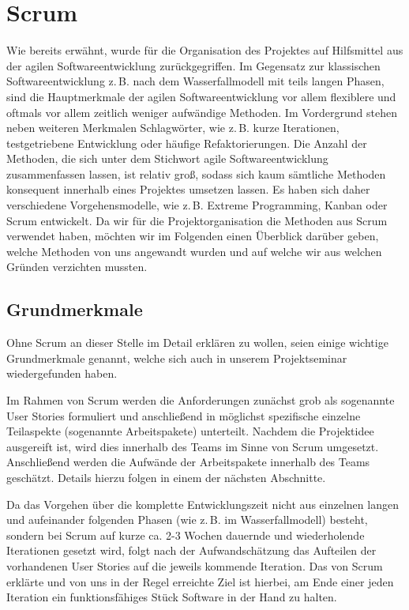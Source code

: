 \section{Scrum}
Wie bereits erwähnt, wurde für die Organisation des Projektes auf Hilfsmittel aus der agilen Softwareentwicklung zurückgegriffen. Im Gegensatz zur klassischen Softwareentwicklung z.\,B. nach dem Wasserfallmodell mit teils langen Phasen, sind die Hauptmerkmale der agilen Softwareentwicklung vor allem flexiblere und oftmals vor allem zeitlich weniger aufwändige Methoden. Im Vordergrund stehen neben weiteren Merkmalen Schlagwörter, wie z.\,B. kurze Iterationen, testgetriebene Entwicklung oder häufige Refaktorierungen. %
Die Anzahl der Methoden, die sich unter dem Stichwort agile Softwareentwicklung zusammenfassen lassen, ist relativ groß, sodass sich kaum sämtliche Methoden konsequent innerhalb eines Projektes umsetzen lassen. Es haben sich daher verschiedene Vorgehensmodelle, wie z.\,B. Extreme Programming, Kanban oder Scrum entwickelt. Da wir für die Projektorganisation die Methoden aus Scrum verwendet haben, möchten wir im Folgenden einen Überblick darüber geben, welche Methoden von uns angewandt wurden und auf welche wir aus welchen Gründen verzichten mussten.

\subsection{Grundmerkmale}
Ohne Scrum an dieser Stelle im Detail erklären zu wollen, seien einige wichtige Grundmerkmale genannt, welche sich auch in unserem Projektseminar wiedergefunden haben.

Im Rahmen von Scrum werden die Anforderungen zunächst grob als sogenannte User Stories formuliert und anschließend in möglichst spezifische einzelne Teilaspekte (sogenannte Arbeitspakete) unterteilt. Nachdem die Projektidee ausgereift ist, wird dies innerhalb des Teams im Sinne von Scrum umgesetzt. Anschließend werden die Aufwände der Arbeitspakete innerhalb des Teams geschätzt. Details hierzu folgen in einem der nächsten Abschnitte.

Da das Vorgehen über die komplette Entwicklungszeit nicht aus einzelnen langen und aufeinander folgenden Phasen (wie z.\,B. im Wasserfallmodell) besteht, sondern bei Scrum auf kurze ca. 2-3 Wochen dauernde und wiederholende Iterationen gesetzt wird, folgt nach der Aufwandschätzung das Aufteilen der vorhandenen User Stories auf die jeweils kommende Iteration.
Das von Scrum erklärte und von uns in der Regel erreichte Ziel ist hierbei, am Ende einer jeden Iteration ein funktionsfähiges Stück Software in der Hand zu halten.

